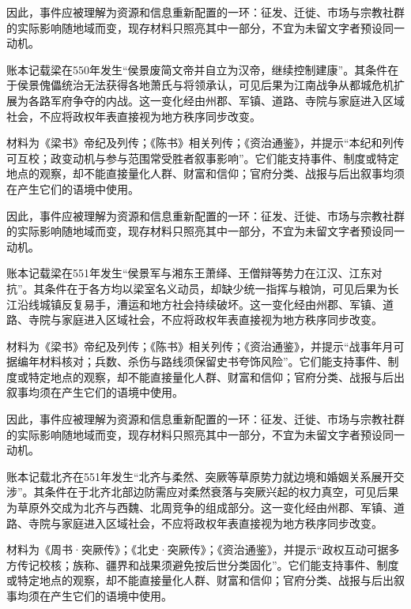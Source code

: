 因此，事件应被理解为资源和信息重新配置的一环：征发、迁徙、市场与宗教社群的实际影响随地域而变，现存材料只照亮其中一部分，不宜为未留文字者预设同一动机。

账本记载梁在550年发生“侯景废简文帝并自立为汉帝，继续控制建康”。其条件在于侯景傀儡统治无法获得各地萧氏与将领承认，可见后果为江南战争从都城危机扩展为各路军府争夺的内战。这一变化经由州郡、军镇、道路、寺院与家庭进入区域社会，不应将政权年表直接视为地方秩序同步改变。

材料为《梁书》帝纪及列传；《陈书》相关列传；《资治通鉴》，并提示“本纪和列传可互校；政变动机与参与范围常受胜者叙事影响”。它们能支持事件、制度或特定地点的观察，却不能直接量化人群、财富和信仰；官府分类、战报与后出叙事均须在产生它们的语境中使用。

因此，事件应被理解为资源和信息重新配置的一环：征发、迁徙、市场与宗教社群的实际影响随地域而变，现存材料只照亮其中一部分，不宜为未留文字者预设同一动机。

账本记载梁在551年发生“侯景军与湘东王萧绎、王僧辩等势力在江汉、江东对抗”。其条件在于各方均以梁室名义动员，却缺少统一指挥与粮饷，可见后果为长江沿线城镇反复易手，漕运和地方社会持续破坏。这一变化经由州郡、军镇、道路、寺院与家庭进入区域社会，不应将政权年表直接视为地方秩序同步改变。

材料为《梁书》帝纪及列传；《陈书》相关列传；《资治通鉴》，并提示“战事年月可据编年材料核对；兵数、杀伤与路线须保留史书夸饰风险”。它们能支持事件、制度或特定地点的观察，却不能直接量化人群、财富和信仰；官府分类、战报与后出叙事均须在产生它们的语境中使用。

因此，事件应被理解为资源和信息重新配置的一环：征发、迁徙、市场与宗教社群的实际影响随地域而变，现存材料只照亮其中一部分，不宜为未留文字者预设同一动机。

账本记载北齐在551年发生“北齐与柔然、突厥等草原势力就边境和婚姻关系展开交涉”。其条件在于北齐北部边防需应对柔然衰落与突厥兴起的权力真空，可见后果为草原外交成为北齐与西魏、北周竞争的组成部分。这一变化经由州郡、军镇、道路、寺院与家庭进入区域社会，不应将政权年表直接视为地方秩序同步改变。

材料为《周书·突厥传》；《北史·突厥传》；《资治通鉴》，并提示“政权互动可据多方传记校核；族称、疆界和战果须避免按后世分类固化”。它们能支持事件、制度或特定地点的观察，却不能直接量化人群、财富和信仰；官府分类、战报与后出叙事均须在产生它们的语境中使用。

